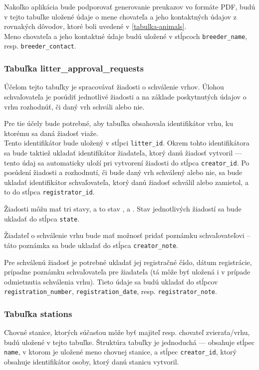 Nakoľko aplikácia bude podporovať generovanie preukazov vo formáte PDF, budú v tejto tabuľke uložené údaje o mene chovateľa a jeho kontaktných údajov z rovnakých dôvodov, ktoré boli uvedené v \ref{tabulka-animals}. \\ Meno chovateľa
a jeho kontaktné údaje budú uložené v stĺpcoch \texttt{breeder_name}, resp. \texttt{breeder_contact}.

\subsubsection*{Tabuľka litter\_approval\_requests}
Účelom tejto tabuľky je spracovávať žiadosti o schválenie vrhov. Úlohou schvaľovateľa je posúdiť jednotlivé žiadosti a na základe poskytnutých údajov o vrhu rozhodnúť, či daný vrh schváli alebo nie.

Pre tie účely bude potrebné, aby tabuľka obsahovala identifikátor vrhu, ku ktorému sa daná žiadosť viaže. \\ Tento identifikátor bude uložený v stĺpci \texttt{litter_id}. Okrem tohto identifikátora sa bude taktiež ukladať identifikátor žiadateľa, ktorý danú žiadosť vytvoril --- tento údaj sa automaticky uloží pri vytvorení žiadosti do stĺpca \texttt{creator_id}. Po posúdení žiadosti a rozhodnutí, či bude daný vrh schválený alebo nie, sa bude ukladať identifikátor schvaľovateľa, ktorý danú žiadosť schválil alebo zamietol, a to do stĺpca \texttt{registrator_id}.

Žiadosti môžu mať tri stavy, a to stav ,  a . Stav jednotlivých žiadostí sa bude ukladať do stĺpca \texttt{state}.

Žiadateľ o schválenie vrhu bude mať možnosť pridať poznámku schvaľovateľovi -- táto poznámka sa bude ukladať do stĺpca \texttt{creator_note}.

Pre schválenú žiadosť je potrebné ukladať jej registračné číslo, dátum registrácie, prípadne poznámku schvaľovateľa pre žiadateľa (tá môže byť uložená i v prípade odmietnutia schválenia vrhu). Tieto údaje sa budú ukladať do stĺpcov \texttt{registration_number}, \texttt{registration_date}, resp. \texttt{registrator_note}.

\subsubsection*{Tabuľka stations}
Chovné stanice, ktorých súčasťou môže byť majiteľ resp. chovateľ zvieraťa/vrhu, budú uložené v tejto tabuľke.
Štruktúra tabuľky je jednoduchá --- obsahuje stĺpec \texttt{name}, v ktorom je uložené meno chovnej stanice, a stĺpec \texttt{creator_id}, ktorý obsahuje identifikátor osoby, ktorý danú stanicu vytvoril.

